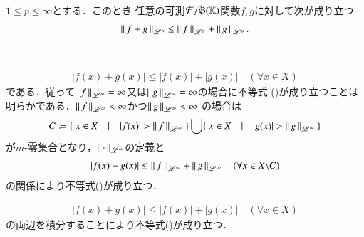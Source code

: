 \begin{qst}
\begin{thm}[Minkowskiの不等式]
	$1 \leq p \leq \infty$とする．このとき
	任意の可測$\mathcal{F}/\mathfrak{B}(\mathbb{K})$関数$f,g$に対して次が成り立つ:
	\begin{align}
		\left\|\, f+g\, \right\|_{\mathscr{L}^p} \leq \left\|\, f\, \right\|_{\mathscr{L}^p} + \left\|\, g\, \right\|_{\mathscr{L}^p}. \label{ineq:minkowski}
	\end{align}
\end{thm}
\begin{prf}
	\begin{description}\mbox{}\\
		\item[$p = \infty$の場合]
			\begin{align}
				|f(x) + g(x)| \leq |f(x)| + |g(x)| \quad (\forall x \in X)
			\end{align}
			である．従って$\left\|\, f\, \right\|_{\mathscr{L}^\infty} = \infty$又は$\left\|\, g\, \right\|_{\mathscr{L}^\infty} = \infty$の場合に不等式
			()が成り立つことは明らかである．$\left\|\, f\, \right\|_{\mathscr{L}^\infty} < \infty$かつ$\left\|\, g\, \right\|_{\mathscr{L}^\infty} < \infty$
			の場合は
			\begin{align}
				C \coloneqq \{\ x \in X\quad |\quad |f(x)| > \left\|\, f\, \right\|_{\mathscr{L}^\infty}\ \} \bigcup \{\ x \in X\quad |\quad |g(x)| > \left\|\, g\, \right\|_{\mathscr{L}^\infty}\ \}
			\end{align}
			が$m$-零集合となり，$\left\|\, \cdot\, \right\|_{\mathscr{L}^\infty}$の定義と
			\begin{align}
				|f(x) + g(x)| \leq \left\|\, f\, \right\|_{\mathscr{L}^\infty} + \left\|\, g\, \right\|_{\mathscr{L}^\infty} \quad (\forall x \in X \backslash C)
			\end{align}
			の関係により不等式()が成り立つ．
		
		\item[$p = 1$の場合]
			\begin{align}
				|f(x) + g(x)| \leq |f(x)| + |g(x)| \quad (\forall x \in X)
			\end{align}
			の両辺を積分することにより不等式()が成り立つ．
		

\end{description}
\end{prf}
\end{qst}
